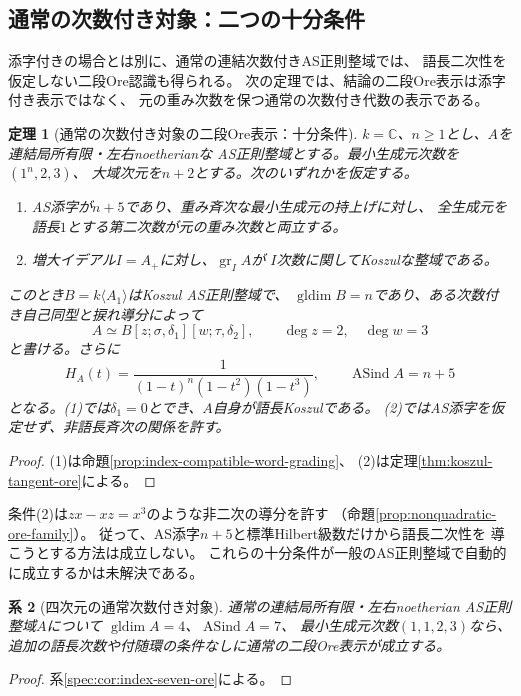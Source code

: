 \documentclass[11pt,a4paper]{ltjsarticle}
\newtheorem{theorem}{定理}[section]
\newtheorem{corollary}[theorem]{系}
\theoremstyle{definition}
\newcommand{\gldim}{\operatorname{gldim}}
\newcommand{\gr}{\operatorname{gr}}
\begin{document}
\subsection{通常の次数付き対象：二つの十分条件}
添字付きの場合とは別に、通常の連結次数付きAS正則整域では、
語長二次性を仮定しない二段Ore認識も得られる。
次の定理では、結論の二段Ore表示は添字付き表示ではなく、
元の重み次数を保つ通常の次数付き代数の表示である。

\begin{theorem}[通常の次数付き対象の二段Ore表示：十分条件]
\label{intro:thm:graded-sufficient}
$k=\mathbb C$、$n\ge1$とし、$A$を連結局所有限・左右noetherianな
AS正則整域とする。最小生成元次数を$(1^n,2,3)$、
大域次元を$n+2$とする。次のいずれかを仮定する。
\begin{enumerate}
\item AS添字が$n+5$であり、重み斉次な最小生成元の持上げに対し、
全生成元を語長$1$とする第二次数が元の重み次数と両立する。
\item 増大イデアル$I=A_+$に対し、$\gr_I A$が
$I$次数に関してKoszulな整域である。
\end{enumerate}
このとき$B=k\langle A_1\rangle$はKoszul AS正則整域で、
$\gldim B=n$であり、ある次数付き自己同型と捩れ導分によって
\[
 A\simeq B[z;\sigma,\delta_1][w;\tau,\delta_2],
 \qquad \deg z=2,\quad \deg w=3
\]
と書ける。さらに
\[
 H_A(t)=\frac{1}{(1-t)^n(1-t^2)(1-t^3)},
 \qquad \operatorname{ASind}A=n+5
\]
となる。(1)では$\delta_1=0$とでき、$A$自身が語長Koszulである。
(2)ではAS添字を仮定せず、非語長斉次の関係を許す。
\end{theorem}
\begin{proof}
(1)は命題\ref{prop:index-compatible-word-grading}、
(2)は定理\ref{thm:koszul-tangent-ore}による。
\end{proof}

条件(2)は$zx-xz=x^3$のような非二次の導分を許す
（命題\ref{prop:nonquadratic-ore-family}）。
従って、AS添字$n+5$と標準Hilbert級数だけから語長二次性を
導こうとする方法は成立しない。
これらの十分条件が一般のAS正則整域で自動的に成立するかは未解決である。

\begin{corollary}[四次元の通常次数付き対象]
\label{intro:cor:graded-n2}
通常の連結局所有限・左右noetherian AS正則整域$A$について
$\gldim A=4$、$\operatorname{ASind}A=7$、
最小生成元次数$(1,1,2,3)$なら、
追加の語長次数や付随環の条件なしに通常の二段Ore表示が成立する。
\end{corollary}
\begin{proof}
系\ref{spec:cor:index-seven-ore}による。
\end{proof}
\end{document}
